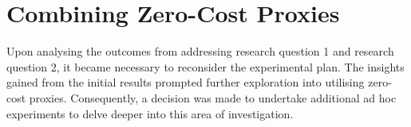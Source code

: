 \section{Combining Zero-Cost Proxies}

Upon analysing the outcomes from addressing research question 1 and research question 2, it became necessary to reconsider the experimental plan. The insights gained from the initial results prompted further exploration into utilising zero-cost proxies. Consequently, a decision was made to undertake additional ad hoc experiments to delve deeper into this area of investigation.


